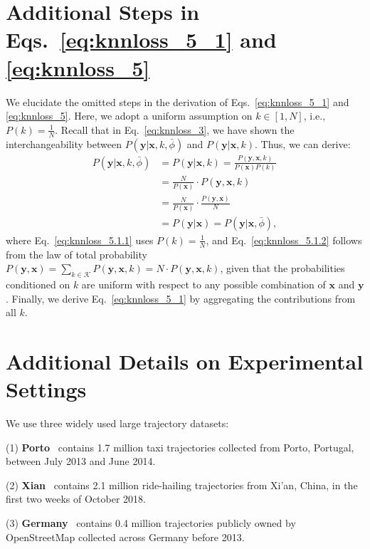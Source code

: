 \appendix


\section{Additional Steps in Eqs.~\eqref{eq:knnloss_5_1} and \eqref{eq:knnloss_5}}\label{app:eq_steps}
We elucidate the omitted steps in the derivation of Eqs.~\eqref{eq:knnloss_5_1} and \eqref{eq:knnloss_5}.  
Here, we adopt a uniform assumption on $k\in[1, N]$, i.e., $P(k)=\frac{1}{N}$. 
Recall that in Eq.~\eqref{eq:knnloss_3}, we have shown the interchangeability between $P(\mathbf{y} | \mathbf{x}, k, \bar{\phi})$ and $P(\mathbf{y} | \mathbf{x}, k)$. Thus, we can derive:
\begin{align}
    P(\mathbf{y} | \mathbf{x}, k, \bar{\phi}) &= P(\mathbf{y}|\mathbf{x}, k) = \frac{P(\mathbf{y},\mathbf{x}, k)}{P(\mathbf{x})P(k)} \nonumber\\
    &= \frac{N}{P(\mathbf{x})}\cdot P(\mathbf{y},\mathbf{x}, k) \label{eq:knnloss_5.1.1}\\
    &= \frac{N}{P(\mathbf{x})}\cdot \frac{P(\mathbf{y},\mathbf{x})}{N} \label{eq:knnloss_5.1.2}\\
    & = P(\mathbf{y}|\mathbf{x}) = P(\mathbf{y}|\mathbf{x}, \bar{\phi}), \label{eq:knnloss_5.1}
\end{align}
where Eq.~\eqref{eq:knnloss_5.1.1} uses $P(k)=\frac{1}{N}$, and Eq.~\eqref{eq:knnloss_5.1.2} follows from the law of total probability $P(\mathbf{y},\mathbf{x})  = \sum_{k\in\mathcal{K}} P(\mathbf{y},\mathbf{x}, k) = N\cdot P(\mathbf{y},\mathbf{x}, k)$, given that the probabilities conditioned on $k$ are uniform with respect to any possible combination of $\mathbf{x}$ and $\mathbf{y}$. Finally, we derive Eq.~\eqref{eq:knnloss_5_1} by aggregating the contributions from all $k$.  

\section{Additional Details on Experimental Settings}\label{app:exp_setup}
We use three widely used large trajectory datasets:

(1) \textbf{Porto}~\cite{porto} contains 1.7 million taxi trajectories collected from Porto, Portugal, between July 2013 and June 2014. 

(2) \textbf{Xian}~\cite{didi} contains 2.1 million ride-hailing trajectories from Xi’an, China, in the first two weeks of October 2018.

(3) \textbf{Germany}~\cite{osmplanet} contains 0.4 million trajectories publicly owned by OpenStreetMap collected across Germany before 2013.

